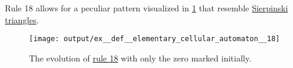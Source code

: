\begin{example}
\begin{thmenum}
     Rule 18 allows for a peculiar pattern visualized in \cref{fig:ex:def:elementary_cellular_automaton/18} that resemble \hyperref[def:sierpinski_triangle]{Sierpinski triangles}.

    \begin{figure}[!ht]
      \centering
      \texttt{[image: output/ex\_\_def\_\_elementary\_cellular\_automaton\_\_18]}
      \caption{The evolution of \hyperref[ex:def:elementary_cellular_automaton/18]{rule 18} with only the zero marked initially.}\label{fig:ex:def:elementary_cellular_automaton/18}
    \end{figure}
  \end{thmenum}
\end{example}
